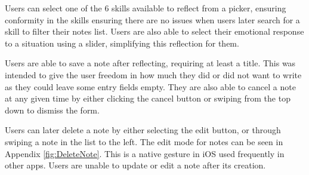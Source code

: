 \documentclass{l4proj}
\begin{document}
Users can select one of the 6 skills available to reflect from a picker, ensuring conformity in the skills ensuring there are no issues when users later search for a skill to filter their notes list. Users are also able to select their emotional response to a situation using a slider, simplifying this reflection for them. 

Users are able to save a note after reflecting, requiring at least a title. This was intended to give the user freedom in how much they did or did not want to write as they could leave some entry fields empty. They are also able to cancel a note at any given time by either clicking the cancel button or swiping from the top down to dismiss the form. 

Users can later delete a note by either selecting the edit button, or through swiping a note in the list to the left. The edit mode for notes can be seen in Appendix \ref{fig:DeleteNote}. This is a native gesture in iOS used frequently in other apps. Users are unable to update or edit a note after its creation.
\end{document}
